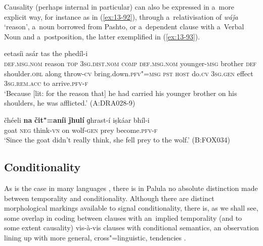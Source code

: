 Causality (perhaps internal in particular) can also be expressed in a~more explicit way, for instance as in (\ref{ex:13-92}), through a~relativisation of \textit{wáǰa} `reason', a~noun borrowed from Pashto, or a~dependent clause with a~Verbal Noun and a~postposition, the latter exemplified in (\ref{ex:13-93}).

\begin{exe}
\ex
\label{ex:13-92}
 eetasíi asár tas the phedíl-i \\
\textsc{def.msg.nom} reason \textsc{top} \textsc{3sg.dist.nom} \textsc{comp} \textsc{def.msg.nom} younger-\textsc{msg} brother \textsc{def}{\protect\footnotemark} shoulder.\textsc{obl} along throw-\textsc{cv} bring.down.\textsc{pfv"=msg} \textsc{pst} \textsc{host} do.\textsc{cv}  \textsc{3sg.gen} effect \textsc{3sg.rem.acc} to arrive.\textsc{pfv-f} \\
\glt `Because [lit: for the reason that] he had carried his younger brother on his shoulders, he was afflicted.' (A:DRA028-9)

\ex
\label{ex:13-93}
\gll čhéeli \textbf{na} \textbf{čit"=aníi} \textbf{ǰhulí} ɡhrast-í iṣkáar bhíl-i \\
goat \textsc{neg} think-\textsc{vn} on wolf-\textsc{gen} prey become.\textsc{pfv-f}  \\
\glt `Since the goat didn't really think, she fell prey to the wolf.' (B:FOX034)
\end{exe}


\subsection{Conditionality}
\label{subsec:13-4-4}

As is the case in many languages \citep[257--258]{thompsonetal2007}, there is in Palula no absolute distinction made between temporality and conditionality. Although there are distinct morphological markings available to signal conditionality, there is, as we shall see, some overlap in coding between clauses with an~implied temporality (and to some extent causality) vis-à-vis clauses with conditional semantics, an observation lining up with more general, cross"=linguistic, tendencies \citep[161]{cristofaro2005}.



